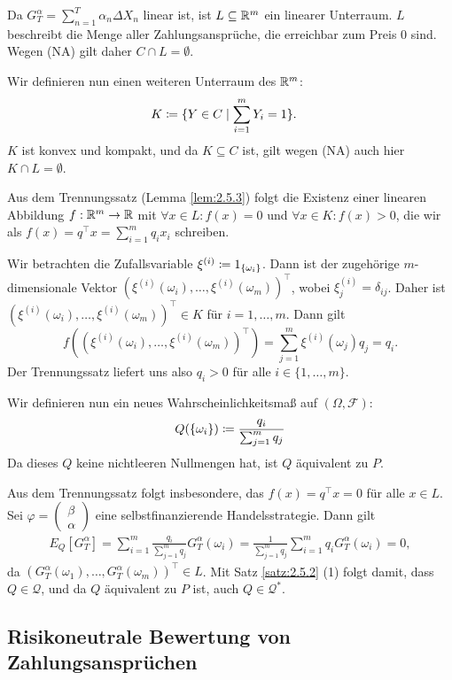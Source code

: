 \documentclass[a4paper,twoside,DIV15,BCOR12mm]{scrbook}
\newcommand{\cF}{\mathcal F}
\newcommand{\cQ}{\mathcal Q}
\begin{document}
\begin{beweis}
Da $G_T^\alpha = \sum_{n=1}^T \alpha_n \Delta X_n$ linear ist, ist $L\subseteq\mathbb{R}^m$ ein linearer Unterraum. $L$ beschreibt die Menge aller Zahlungsansprüche, die erreichbar zum Preis 0 sind. Wegen (NA) gilt daher $C\cap L =\emptyset$.

Wir definieren nun einen weiteren Unterraum des $\mathbb{R}^m$:
\begin{align*}
K &\da \{Y\in C \mid  \sum_{i=1}^m Y_i = 1\}.
\end{align*}
$K$ ist konvex und kompakt, und da $K\subseteq C$ ist, gilt wegen (NA) auch hier $K\cap L=\emptyset$.

Aus dem Trennungssatz (Lemma \ref{lem:2.5.3}) folgt die Existenz einer linearen Abbildung $f:\mathbb{R}^m\to \mathbb{R}$ mit $\forall x\in L: f(x)=0$ und $\forall x\in K: f(x) >0$, die wir als $f(x) = q^\top x = \sum_{i=1}^m q_i x_i$ schreiben.

Wir betrachten die Zufallsvariable $\xi^{(i)} \da 1_{\{\omega_i\}}$. Dann ist der zugehörige $m$-dimensionale Vektor $(\xi^{(i)}(\omega_i),\ldots,\xi^{(i)}(\omega_m))^\top$, wobei $\xi_j^{(i)} = \delta_{ij}$. Daher ist  $(\xi^{(i)}(\omega_i),\ldots,\xi^{(i)}(\omega_m))^\top\in K$ für $i=1,\ldots,m$. Dann gilt 
\[
f((\xi^{(i)}(\omega_i),\ldots,\xi^{(i)}(\omega_m))^\top) = \sum_{j=1}^m \xi^{(i)}(\omega_j)q_j = q_i.
\]
Der Trennungssatz liefert uns also $q_i>0$ für alle $i\in\{1,\ldots,m\}$.

Wir definieren nun ein neues Wahrscheinlichkeitsmaß auf $(\Omega, \cF)$:
\[
Q(\{\omega_i\}) \da \frac{q_i}{\sum_{j=1}^m q_j}
\]
Da dieses $Q$ keine nichtleeren Nullmengen hat, ist $Q$ äquivalent zu $P$.

Aus dem Trennungssatz folgt insbesondere, das $f(x)=q^\top x=0$ für alle $x\in L$. Sei 
$\varphi=\left(\begin{smallmatrix} \beta \\ \alpha \end{smallmatrix}\right)$
eine selbstfinanzierende Handelsstrategie. Dann gilt 
\begin{align*}
E_Q[G_T^\alpha] = \sum_{i=1}^m \frac{q_i}{\sum_{j=1}^m q_j} G_T^\alpha(\omega_i) = \frac{1}{\sum_{j=1}^m q_j} \sum_{i=1}^m q_i G_T^\alpha(\omega_i) = 0,
\end{align*}
da $(G_T^\alpha(\omega_1),\ldots,G_T^\alpha(\omega_m))^\top\in L$. Mit Satz \ref{satz:2.5.2} (1) folgt damit, dass $Q\in \cQ$, und da $Q$ äquivalent zu $P$ ist, auch $Q\in \cQ^*$.
\end{beweis}

\subsection{Risikoneutrale Bewertung von Zahlungsansprüchen}
\end{document}
